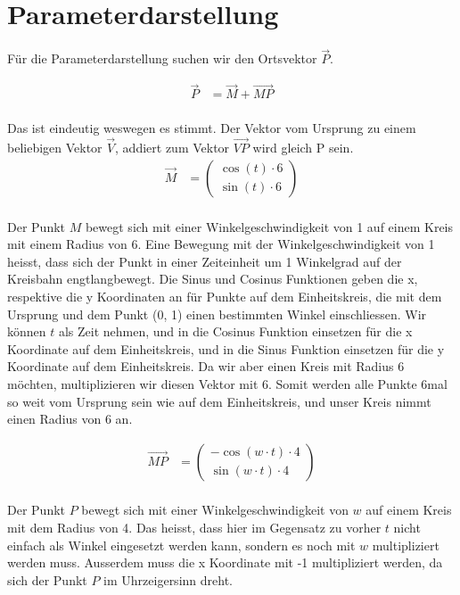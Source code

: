 \documentclass[12pt, a4paper, twoside]{article}
\begin{document}
\section{Parameterdarstellung}
Für die Parameterdarstellung suchen wir den Ortsvektor $\vec{P}$.

\begin{align*}
  \overrightarrow{P} & = \overrightarrow{M} + \overrightarrow{MP} \\
\end{align*}

Das ist eindeutig weswegen es stimmt.
Der Vektor vom Ursprung zu einem beliebigen Vektor $\overrightarrow{V}$, addiert zum Vektor $\overrightarrow{VP}$ wird gleich P sein.
\\

\begin{align*}
  \overrightarrow{M} & = \begin{pmatrix}
    \cos(t) \cdot 6
    \\
    \sin(t) \cdot 6
  \end{pmatrix} \\
\end{align*}

Der Punkt $M$ bewegt sich mit einer Winkelgeschwindigkeit von 1 auf einem Kreis mit einem Radius von 6.
Eine Bewegung mit der Winkelgeschwindigkeit von 1 heisst, dass sich der Punkt in einer Zeiteinheit um 1 Winkelgrad auf der Kreisbahn engtlangbewegt.
Die Sinus und Cosinus Funktionen geben die x, respektive die y Koordinaten an für Punkte auf dem Einheitskreis, die mit dem Ursprung und dem Punkt (0, 1) einen bestimmten Winkel einschliessen.
Wir können $t$ als Zeit nehmen, und in die Cosinus Funktion einsetzen für die x Koordinate auf dem Einheitskreis, und in die Sinus Funktion einsetzen für die y Koordinate auf dem Einheitskreis.
Da wir aber einen Kreis mit Radius 6 möchten, multiplizieren wir diesen Vektor mit 6.
Somit werden alle Punkte 6mal so weit vom Ursprung sein wie auf dem Einheitskreis, und unser Kreis nimmt einen Radius von 6 an.

\begin{align*}
  \overrightarrow{MP} & = \begin{pmatrix}
    -\cos(w\cdot t) \cdot 4
    \\
    \sin(w\cdot t) \cdot 4
  \end{pmatrix}
\end{align*}
\\

Der Punkt $P$ bewegt sich mit einer Winkelgeschwindigkeit von $w$ auf einem Kreis mit dem Radius von 4.
Das heisst, dass hier im Gegensatz zu vorher $t$ nicht einfach als Winkel eingesetzt werden kann, sondern es noch mit $w$ multipliziert werden muss.
Ausserdem muss die x Koordinate mit -1 multipliziert werden, da sich der Punkt $P$ im Uhrzeigersinn dreht.
\end{document}
